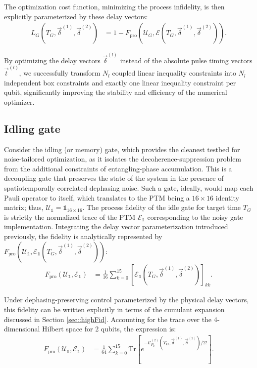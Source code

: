 \documentclass[%
 reprint,
superscriptaddress,
 amsmath,amssymb,
 aps,
pra,
]{revtex4-2}
\newcommand{\qk}[1]{{\color{OliveGreen}#1}}
\begin{document}
The optimization cost function, minimizing the process infidelity, is then explicitly parameterized by these delay vectors:
\begin{align}
    L_G(T_G, \vec{\delta}^{(1)}, \vec{\delta}^{(2)}) &= 1 - F_{\text{pro}}\left(\mathcal{U}_G, \mathcal{E}(T_G, \vec{\delta}^{(1)}, \vec{\delta}^{(2)})\right).
\end{align}

By optimizing the delay vectors $\vec{\delta}^{(l)}$ instead of the absolute pulse timing vectors $\vec{t}^{(l)}$, we successfully transform $N_l$ coupled linear inequality constraints into $N_l$ independent box constraints and exactly one linear inequality constraint per qubit, significantly improving the stability and efficiency of the numerical optimizer.

\subsection{Idling gate}
Consider the idling (or memory) gate, which \qk{provides the cleanest testbed for noise-tailored optimization, as it isolates the decoherence-suppression problem from the additional constraints of entangling-phase accumulation}.
This is a decoupling gate that preserves the state of the system in the presence of spatiotemporally correlated dephasing noise.
Such a gate, ideally, would map each Pauli operator to itself, which translates to the PTM being a $16 \times 16$ identity matrix; thus, $\mathcal{U}_\mathbb{1} = \mathbb{1}_{16\times 16}$.
The process fidelity of the idle gate for target time $T_G$ is strictly the normalized trace of the PTM $\mathcal{E}_\mathbb{1}$ corresponding to the noisy gate implementation.
Integrating the delay vector parameterization introduced previously, the fidelity is analytically represented by $F_{\text{pro}}\left(\mathcal{U}_\mathbb{1}, \mathcal{E}_\mathbb{1}(T_G, \vec{\delta}^{(1)}, \vec{\delta}^{(2)})\right)$:
\begin{align}
    F_{\text{pro}}\left(\mathcal{U}_\mathbb{1}, \mathcal{E}_\mathbb{1}\right) &= \frac{1}{16} \sum_{k=0}^{15} \left[\mathcal{E}_\mathbb{1}(T_G, \vec{\delta}^{(1)}, \vec{\delta}^{(2)})\right]_{kk}.
\end{align}

Under dephasing-preserving control parameterized by the physical delay vectors, this fidelity can be written explicitly in terms of the cumulant expansion discussed in Section \ref{sec::highFid}.
Accounting for the trace over the 4-dimensional Hilbert space for 2 qubits, the expression is:
\begin{align}
    F_{\text{pro}}(\mathcal{U}_\mathbb{1}, \mathcal{E}_\mathbb{1}) &= \frac{1}{64} \sum_{k=0}^{15} \text{Tr}\left[e^{-\mathcal{C}^{(2)}_{P_k}(T_G, \vec{\delta}^{(1)}, \vec{\delta}^{(2)})/2!}\right].
\end{align}
\end{document}
